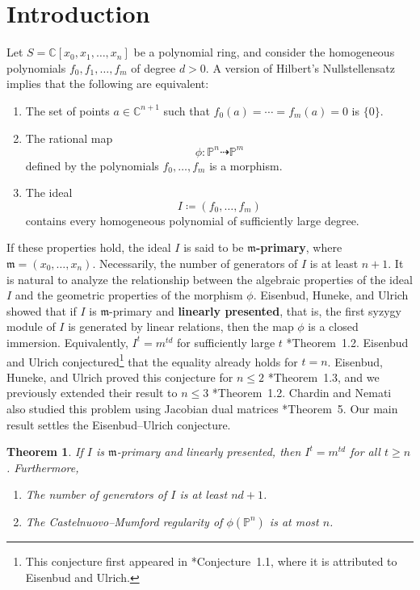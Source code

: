 \documentclass[11pt,letterpaper,reqno]{amsart}
\newcommand{\CC}{\mathbb{C}}
\newcommand{\m}{\mathfrak{m}}
\def\PP{{\mathbb P}}
\newtheorem{thmx}{Theorem}
\theoremstyle{definition}
\numberwithin{equation}{section}
\begin{document}
\section{Introduction}\label{sec:intro}
Let $S = \CC[x_0,x_1,\dots,x_n]$ be a polynomial ring, and consider the homogeneous polynomials $f_0,f_1,\dots,f_m$ of degree $d > 0$. A version of Hilbert's Nullstellensatz implies that the following are equivalent:
\begin{enumerate}
    \item The set of points $a \in \CC^{n+1}$ such that $f_0(a) = \cdots = f_m(a) = 0$ is $\{0\}$.\vspace{0.05in}
    \item The rational map
    \[\phi \colon \PP^n \dashrightarrow \PP^m\]
    defined by the polynomials $f_0,\dots,f_m$ is a morphism.\vspace{0.05in}
    \item The ideal
    \[I \coloneqq (f_0,\dots,f_m)\]
    contains every homogeneous polynomial of sufficiently large degree.
\end{enumerate}
If these properties hold, the ideal $I$ is said to be \textbf{$\m$-primary}, where $\m = (x_0,\dots,x_n)$. Necessarily, the number of generators of $I$ is at least $n + 1$. It is natural to analyze the relationship between the algebraic properties of the ideal $I$ and the geometric properties of the morphism $\phi$. Eisenbud, Huneke, and Ulrich showed that if $I$ is $\m$-primary and \textbf{linearly presented}, that is, the first syzygy module of $I$ is generated by linear relations, then the map $\phi$ is a closed immersion. Equivalently, $I^t = m^{td}$ for sufficiently large $t$ \cite{EHU}*{Theorem~1.2}. Eisenbud and Ulrich conjectured\footnote{This conjecture first appeared in \cite{EHU}*{Conjecture~1.1}, where it is attributed to Eisenbud and Ulrich.} that the equality already holds for $t = n$. Eisenbud, Huneke, and Ulrich proved this conjecture for $n \le 2$ \cite{EHU}*{Theorem~1.3}, and we previously extended their result to $n \le 3$ \cite{yang}*{Theorem~1.2}. Chardin and Nemati also studied this problem using Jacobian dual matrices \cite{CN}*{Theorem~5}. Our main result settles the Eisenbud--Ulrich conjecture.
\begin{thmx}\label{mainThm:A}
    If $I$ is $\m$-primary and linearly presented, then $I^t = m^{td}$ for all $t \ge n$. Furthermore,
    \begin{enumerate}
        \item The number of generators of $I$ is at least $nd + 1$.
        \item The Castelnuovo--Mumford regularity of $\phi(\PP^n)$ is at most $n$.
    \end{enumerate}
\end{thmx}
\end{document}
